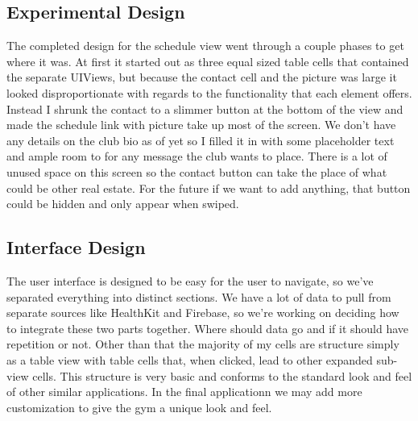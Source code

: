 \documentclass[a4paper]{article}
\begin{document}
\subsection{Experimental Design}

The completed design for the schedule view went through a couple phases to get where it was. At first it started out as three equal sized table cells that contained the separate UIViews, but because the contact cell and the picture was large it looked disproportionate with regards to the functionality that each element offers. Instead I shrunk the contact to a slimmer button at the bottom of the view and made the schedule link with picture take up most of the screen. We don’t have any details on the club bio as of yet so I filled it in with some placeholder text and ample room to for any message the club wants to place. There is a lot of unused space on this screen so the contact button can take the place of what could be other real estate. For the future if we want to add anything, that button could be hidden and only appear when swiped.

\subsection{Interface Design}

The user interface is designed to be easy for the user to navigate, so we’ve separated everything into distinct sections. We have a lot of data to pull from separate sources like HealthKit and Firebase, so we’re working on deciding how to integrate these two parts together. Where should data go and if it should have repetition or not. Other than that the majority of my cells are structure simply as a table view with table cells that, when clicked, lead to other expanded sub-view cells. This structure is very basic and conforms to the standard look and feel of other similar applications. In the final applicationn we may add more customization to give the gym a unique look and feel.
\end{document}
